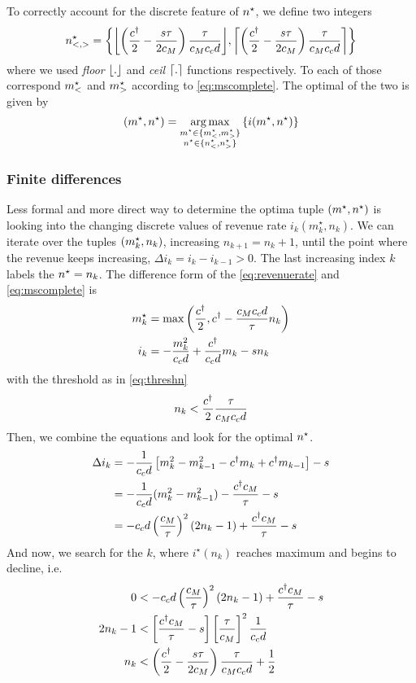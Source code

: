 \documentclass[a4paper]{report}
\DeclarePairedDelimiter\floor{\lfloor}{\rfloor}
\DeclarePairedDelimiter\ceil{\lceil}{\rceil}
\DeclareMathOperator*{\argmax}{arg\,max}
\begin{document}
To correctly account for the discrete feature of $n^\star$, we define two integers
\def\nsd{\left(\frac{\cd}{2}-\frac{s\tau}{2c_M}\right)\frac{\tau}{c_Mc_cd}}
\begin{equation}
	n^\star_{<,>} = \left\{\floor*{\nsd}, \ceil*{\nsd}\right\}\label{eq:twons}
\end{equation}
where we used \emph{floor} $\floor*{.}$ and \emph{ceil} $\ceil*{.}$ functions respectively. To each of those correspond $m^{\star}_<$ and $m^{\star}_>$ according to \autoref{eq:mscomplete}. The optimal of the two is given by
\begin{equation*}
	(\ms,\ns)=\argmax\limits_{\substack{\ms\in\{\ms_<,\ms_>\} \\ \ns\in\{\ns_<,\ns_>\}}}\left\{i(\ms,\ns)\right\}
\end{equation*}

\subsubsection{Finite differences}
Less formal and more direct way to determine the optima tuple $(m^{\star},n^\star)$ is looking into the changing discrete values of revenue rate $i_k(m^\star_k,n_k)$. We can iterate over the tuples $(m^{\star}_k,n_k)$, increasing $n_{k+1}=n_k+1$, until the point where the revenue keeps increasing, $\Delta i_k=i_k-i_{k-1}>0$. The last increasing index $k$ labels the $n^\star=n_k$. The difference form of the \autoref{eq:revenuerate} and \autoref{eq:mscomplete} is
\begin{align}
	m^{\star}_k&=\max\left(\frac{c^{\dagger}}{2},c^{\dagger} - \frac{c_Mc_cd}{\tau} n_k\right) \label{eq:diffmnrel}\\
	i_k&=-\frac{m_k^2}{c_cd}+\frac{c^{\dagger}}{c_cd}m_k-sn_k \label{eq:diffincome}
\end{align}
with the threshold as in \autoref{eq:threshn}
\begin{equation*}
	n_k < \frac{c^{\dagger}}{2} \frac{\tau}{c_Mc_cd}
\end{equation*}
Then, we combine the equations and look for the optimal $n^\star$.
\begin{align*}
	\Delta i_k	&=-\frac{1}{c_cd}\left[m_k^2-m_{k-1}^2 -c^{\dagger} m_k +c^{\dagger} m_{k-1}\right] - s\\
			&=-\frac{1}{c_cd}(m_k^2-m_{k-1}^2)-\frac{c^{\dagger} c_M}{\tau}-s\\
			&=-c_cd\left(\frac{c_M}{\tau}\right)^2(2n_k-1)+\frac{c^{\dagger} c_M}{\tau}-s
\end{align*}
And now, we search for the $k$, where $i^\star(n_k)$ reaches maximum and begins to decline, i.e.
\begin{align*}
	0&<-c_cd\left(\frac{c_M}{\tau}\right)^2(2n_k-1)+\frac{c^{\dagger} c_M}{\tau}-s\\
	2n_k-1&<\left[\frac{c^{\dagger} c_M}{\tau}-s\right]\left[\frac{\tau}{c_M}\right]^2\frac{1}{c_cd}\\
	n_k&<\left(\frac{c^{\dagger}}{2}-\frac{s\tau}{2c_M}\right)\frac{\tau}{c_Mc_c d}+\frac{1}{2}
\end{align*}
\end{document}
